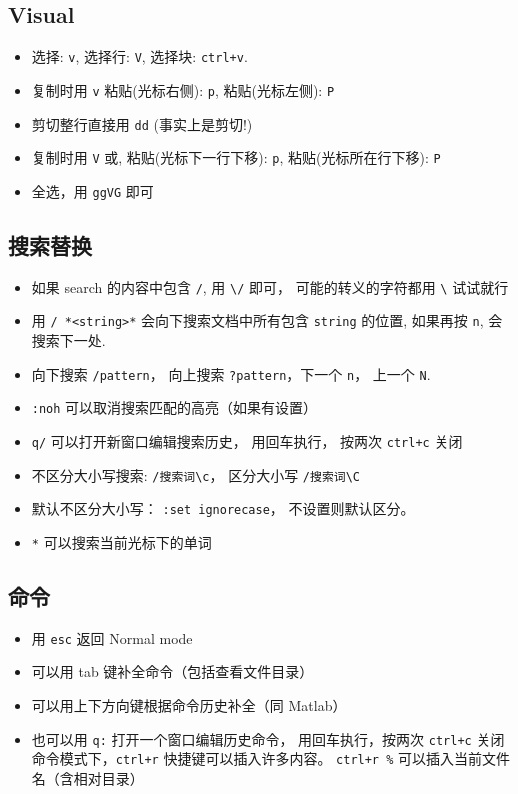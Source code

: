 \subsection{Visual}
\begin{itemize}
\item 选择: \verb`v`, 选择行: \verb`V`, 选择块: \verb`ctrl+v`.
\item 复制时用 \verb`v` 粘贴(光标右侧): \verb`p`, 粘贴(光标左侧): \verb`P`
\item 剪切整行直接用 \verb`dd` (事实上是剪切!)
\item 复制时用 \verb`V` 或, 粘贴(光标下一行下移): \verb`p`, 粘贴(光标所在行下移): \verb`P`
\item 全选，用 \verb`ggVG` 即可
\end{itemize}

\subsection{搜索替换}
\begin{itemize}
\item 如果 search 的内容中包含 \verb`/`, 用 \verb`\/` 即可， 可能的转义的字符都用 \verb`\` 试试就行
\item 用 \verb`/ *<string>*` 会向下搜索文档中所有包含 \verb`string` 的位置, 如果再按 \verb`n`, 会搜索下一处. 
\item 向下搜索 \verb`/pattern`， 向上搜索 \verb`?pattern`，下一个 \verb`n`， 上一个 \verb`N`.
\item \verb`:noh` 可以取消搜索匹配的高亮（如果有设置）
\item \verb`q/` 可以打开新窗口编辑搜索历史， 用回车执行， 按两次 \verb`ctrl+c` 关闭
\item 不区分大小写搜索:  \verb`/搜索词\c`， 区分大小写 \verb`/搜索词\C`
\item 默认不区分大小写： \verb`:set ignorecase`， 不设置则默认区分。
\item \verb`*` 可以搜索当前光标下的单词
\end{itemize}

\subsection{命令}
\begin{itemize}
\item 用 \verb`esc` 返回 Normal mode
\item 可以用 tab 键补全命令（包括查看文件目录）
\item 可以用上下方向键根据命令历史补全（同 Matlab）
\item 也可以用 \verb`q:` 打开一个窗口编辑历史命令， 用回车执行，按两次 \verb`ctrl+c` 关闭
命令模式下，\verb`ctrl+r` 快捷键可以插入许多内容。 \verb`ctrl+r %` 可以插入当前文件名（含相对目录）
\end{itemize}


